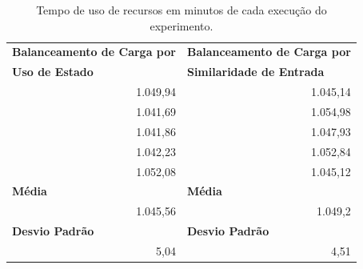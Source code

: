 




\begin{table}[h!]
\centering
\caption{Tempo de uso de recursos em minutos de cada execução do experimento.}
\begin{tabular}{rr}
\multicolumn{1}{l}{\textbf{Balanceamento de Carga por}} & \multicolumn{1}{l}{\textbf{Balanceamento de Carga por}}  \\
\multicolumn{1}{l}{\textbf{Uso de Estado}} & \multicolumn{1}{l}{\textbf{Similaridade de Entrada}}  \\
 1.049,94 & 1.045,14  \\
1.041,69  & 1.054,98 \\
1.041,86  & 1.047,93 \\
1.042,23  & 1.052,84  \\
1.052,08  & 1.045,12  \\
\multicolumn{1}{l}{\textbf{Média}}& \multicolumn{1}{l}{\textbf{Média}} \\
1.045,56  & 1.049,2  \\
\multicolumn{1}{l}{\textbf{Desvio Padrão}} & \multicolumn{1}{l}{\textbf{Desvio Padrão}}  \\
 5,04 & 4,51                         
\end{tabular}
\label{Tab:time_and_avg}
\end{table}

